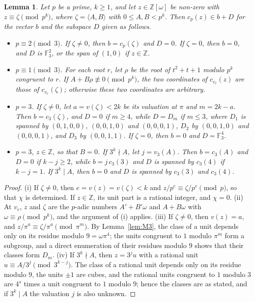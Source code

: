 \documentclass[11pt]{article}
\newtheorem{lemma}[theorem]{Lemma}
\newcommand{\Z}{\mathbb{Z}}
\newcommand{\F}{\mathbb{F}}
\begin{document}
\begin{lemma}\label{lem:residue}
Let $p$ be a prime, $k\geq1$, and let $z\in\Z[\omega]$ be non-zero with $z\equiv\zeta\pmod{p^k}$, where $\zeta=\langle A,B\rangle$ with $0\leq A,B<p^k$. Then $c_p(z)\in b+D$ for the vector $b$ and the subspace $D$ given as follows.
\begin{itemize}
\item[(i)] $p\equiv2\pmod3$. If $\zeta\neq0$, then $b=c_p(\zeta)$ and $D=0$. If $\zeta=0$, then $b=0$, and $D$ is $\F_3^2$, or the span of $(1,0)$ if $z\in\Z$.
\item[(ii)] $p\equiv1\pmod3$. For each root $r$, let $\rho$ be the root of $t^2+t+1$ modulo $p^k$ congruent to $r$. If $A+B\rho\not\equiv0\pmod{p^k}$, the two coordinates of $c_{v_r}(z)$ are those of $c_{v_r}(\zeta)$; otherwise these two coordinates are arbitrary.
\item[(iii)] $p=3$. If $\zeta\neq0$, let $a=v(\zeta)<2k$ be its valuation at $\pi$ and $m=2k-a$. Then $b=c_3(\zeta)$, and $D=0$ if $m\geq4$, while $D=D_m$ if $m\leq3$, where $D_1$ is spanned by $(0,1,0,0)$, $(0,0,1,0)$ and $(0,0,0,1)$, $D_2$ by $(0,0,1,0)$ and $(0,0,0,1)$, and $D_3$ by $(0,0,1,1)$. If $\zeta=0$, then $b=0$ and $D=\F_3^4$.
\item[(iv)] $p=3$, $z\in\Z$, so that $B=0$. If $3^k\nmid A$, let $j=v_3(A)$. Then $b=c_3(A)$ and $D=0$ if $k-j\geq2$, while $b=j\,c_3(3)$ and $D$ is spanned by $c_3(4)$ if $k-j=1$. If $3^k\mid A$, then $b=0$ and $D$ is spanned by $c_3(3)$ and $c_3(4)$.
\end{itemize}
\end{lemma}

\begin{proof}
(i) If $\zeta\neq0$, then $e=v(z)=v(\zeta)<k$ and $z/p^e\equiv\zeta/p^e\pmod p$, so that $\chi$ is determined. If $z\in\Z$, its unit part is a rational integer, and $\chi=0$. (ii) At $v_r$, $z$ and $\zeta$ are the $p$-adic numbers $A'+B'\omega$ and $A+B\omega$ with $\omega\equiv\rho\pmod{p^k}$, and the argument of (i) applies. (iii) If $\zeta\neq0$, then $v(z)=a$, and $z/\pi^a\equiv\zeta/\pi^a\pmod{\pi^m}$. By Lemma~\ref{lem:M3}, the class of a unit depends only on its residue modulo $9=\omega\pi^4$; the units congruent to $1$ modulo $\pi^m$ form a subgroup, and a direct enumeration of their residues modulo $9$ shows that their classes form $D_m$. (iv) If $3^k\nmid A$, then $z=3^ju$ with a rational unit $u\equiv A/3^j\pmod{3^{k-j}}$. The class of a rational unit depends only on its residue modulo $9$, the units $\pm1$ are cubes, and the rational units congruent to $1$ modulo $3$ are $4^s$ times a unit congruent to $1$ modulo $9$; hence the classes are as stated, and if $3^k\mid A$ the valuation $j$ is also unknown.
\end{proof}
\end{document}
